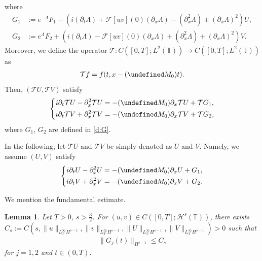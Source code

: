 \documentclass[%
11pt,  reqno]{amsart}
\newtheorem{lemma}[theorem]{Lemma}
\newcommand{\T}{\mathbb{T}}
\newcommand{\TT}{\mathcal{T}}
\renewcommand{\H}{\mathcal H}
\newcommand{\Ld}{\Lambda}
\newcommand{\Ft}{{\mathcal{F}}}
\newcommand{\dx}{\partial_x}
\newcommand{\dt}{\partial_t}
\numberwithin{equation}{section}
\numberwithin{theorem}{section}
\let\Re=\undefined\DeclareMathOperator*{\Re}{Re}
\let\Im=\undefined\DeclareMathOperator*{\Im}{Im}
\begin{document}
where 
\begin{equation}
\begin{aligned}
G_1 &:= e^{-\Ld} F_1 - (i (\dt \Ld) + \Ft[u v](0) (\dx \Ld) - (\dx^2 \Ld) + (\dx \Ld)^2) U,
\\
G_2 &:= e^\Ld F_2 + (i (\dt \Ld) - \Ft[u v](0) (\dx \Ld) + (\dx^2 \Ld) + (\dx \Ld)^2) V.
\end{aligned}
\label{d:G}
\end{equation}
Moreover, we define the operator $\TT: C([0,T]; L^2(\T)) \to C([0,T]; L^2(\T))$ as
\[
\begin{aligned}
\TT f = f(t, x- (\Re M_0) t).
\end{aligned}
\]
Then, $(\TT U, \TT V)$ satisfy
\begin{equation*}
\left\{
\begin{aligned}
i \dt \TT U - \dx^2 \TT U 
&= 
- (\Im M_0) \dx \TT U + \TT G_1,
\\
i \dt \TT V + \dx^2 \TT V 
&= 
- (\Im M_0) \dx \TT V + \TT G_2,
\end{aligned}
\right.
\end{equation*}
where $G_1$, $G_2$ are defined in \eqref{d:G}.

In the following, let $\TT U$ and $\TT V$ be simply denoted as $U$ and $V$. 
Namely, we assume $(U, V)$ satisfy
\begin{equation}
\left\{
\begin{aligned}
i \dt U - \dx^2 U 
&= 
- (\Im M_0) \dx U + G_1,
\\
i \dt V + \dx^2  V 
&= 
- (\Im M_0) \dx V + G_2.
\end{aligned}
\right.
\label{CLLg4}
\end{equation}

We mention the fundamental estimate.
\begin{lemma}
\label{lem:funda}
Let $T > 0$, $s > \frac 32$. 
For $(u, v) \in C([0,T]; \H^s(\T))$,
there exists $C_s:= C(s, \|u\|_{L_T^\infty H^{s-1}}, \|v\|_{L_T^\infty H^{s-1}}, 
\|U\|_{L_T^\infty H^{s-1}}, \|V\|_{L_T^\infty H^{s-1}}) > 0$ such that
\begin{align*}
\|G_j(t)\|_{H^{s-1}} \le C_s
\end{align*}
for $j = 1,2$ and $t \in (0, T)$.
\end{lemma}
\end{document}
